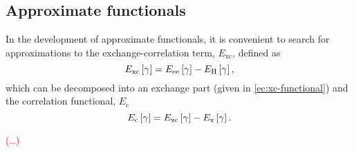 \subsection{Approximate functionals}
In the development of approximate functionals, it is convenient to search for
approximations to the exchange-correlation term, $E_{\text{xc}}$, defined as
\begin{equation} \label{ec:xc-functional}
    E_{\text{xc}} \left[ \gamma \right] =
    E_{\text{ee}} \left[ \gamma \right] - E_{\text{H}} \left[ \gamma \right]
    ,
\end{equation}
which can be decomposed into an exchange part (given in \cref{ec:xc-functional})
and the correlation functional, $E_{\text{c}}$ 
\begin{equation}
    E_{\text{c}} \left[ \gamma \right] =
    E_{\text{xc}} \left[ \gamma \right] - E_{\text{x}} \left[ \gamma \right]
    .
\end{equation}

\textcolor{red}{(\ldots)}

